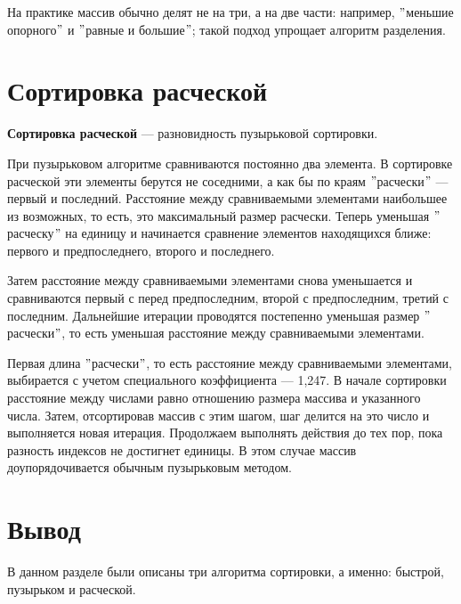 На практике массив обычно делят не на три, а на две части: например, $"$меньшие опорного$"$ и $"$равные и большие$"$; такой подход упрощает алгоритм разделения.

\section{Сортировка расческой}

\textbf{Сортировка расческой} --- разновидность пузырьковой сортировки.

При пузырьковом алгоритме сравниваются постоянно два элемента. В сортировке расческой эти элементы берутся не соседними, а как бы по краям $"$расчески$"$ --- первый и последний. Расстояние между сравниваемыми элементами наибольшее из возможных, то есть, это максимальный размер расчески. Теперь уменьшая $"$расческу$"$ на единицу и начинается сравнение элементов находящихся ближе: первого и предпоследнего, второго и последнего.

Затем расстояние между сравниваемыми элементами снова уменьшается и сравниваются первый с перед предпоследним, второй с предпоследним, третий с последним. Дальнейшие итерации проводятся постепенно уменьшая размер $"$расчески$"$, то есть уменьшая расстояние между сравниваемыми элементами.

Первая длина $"$расчески$"$, то есть расстояние между сравниваемыми элементами, выбирается с учетом специального коэффициента --- 1,247. В начале сортировки расстояние между числами равно отношению размера массива и указанного числа. Затем, отсортировав массив с этим шагом, шаг делится на это число и выполняется новая итерация. Продолжаем выполнять действия до тех пор, пока разность индексов не достигнет единицы. В этом случае массив доупорядочивается обычным пузырьковым методом.


\section*{Вывод}

В данном разделе были описаны три алгоритма сортировки, а именно: быстрой, пузырьком и расческой. 



